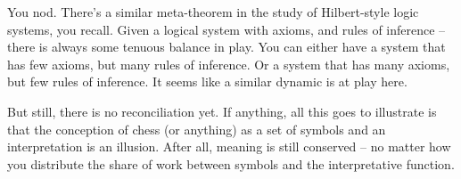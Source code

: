 You nod. There's a similar meta-theorem in the study of Hilbert-style logic systems, you recall. Given a logical system with axioms, and rules of inference -- there is always some tenuous balance in play. You can either have a system that has few axioms, but many rules of inference. Or a system that has many axioms, but few rules of inference. It seems like a similar dynamic is at play here.

But still, there is no reconciliation yet. If anything, all this goes to illustrate is that the conception of chess (or anything) as a set of symbols and an interpretation is an illusion. After all, meaning is still conserved -- no matter how you distribute the share of work between symbols and the interpretative function.

%
%
%
